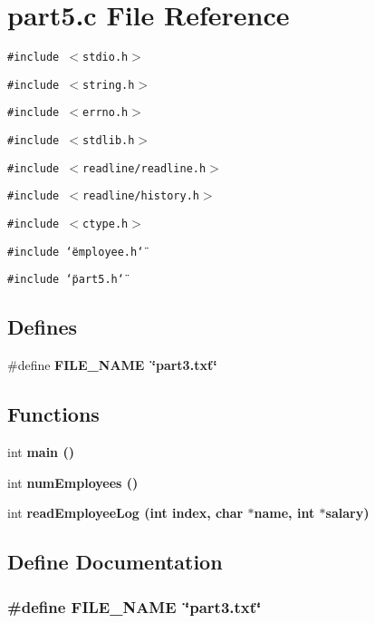 \section{part5.c File Reference}
\label{part5_8c}
{\tt \#include $<$stdio.h$>$}\par
{\tt \#include $<$string.h$>$}\par
{\tt \#include $<$errno.h$>$}\par
{\tt \#include $<$stdlib.h$>$}\par
{\tt \#include $<$readline/readline.h$>$}\par
{\tt \#include $<$readline/history.h$>$}\par
{\tt \#include $<$ctype.h$>$}\par
{\tt \#include \char`\"{}employee.h\char`\"{}}\par
{\tt \#include \char`\"{}part5.h\char`\"{}}\par
\subsection*{Defines}
\begin{CompactItemize}
\item 
\#define \bf{FILE\_\-NAME}~\char`\"{}part3.txt\char`\"{}
\end{CompactItemize}
\subsection*{Functions}
\begin{CompactItemize}
\item 
int \bf{main} ()
\item 
int \bf{num\-Employees} ()
\item 
int \bf{read\-Employee\-Log} (int index, char $\ast$name, int $\ast$salary)
\end{CompactItemize}


\subsection{Define Documentation}
\subsubsection{\setlength{\rightskip}{0pt plus 5cm}\#define FILE\_\-NAME~\char`\"{}part3.txt\char`\"{}}\label{part5_8c_b117546549783a058d0321a287699579}




